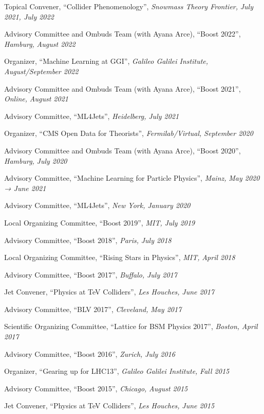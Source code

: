 \item Topical Convener, ``Collider Phenomenology'', \emph{Snowmass Theory Frontier, }\emph{July 2021, July 2022}
\item Advisory Committee and Ombuds Team (with Ayana Arce), ``Boost 2022'', \emph{Hamburg, }\emph{August 2022}
\item Organizer, ``Machine Learning at GGI'', \emph{Galileo Galilei Institute, }\emph{August/September 2022}
\item Advisory Committee and Ombuds Team (with Ayana Arce), ``Boost 2021'', \emph{Online, }\emph{August 2021}
\item Advisory Committee, ``ML4Jets'', \emph{Heidelberg, }\emph{July 2021}
\item Organizer, ``CMS Open Data for Theorists'', \emph{Fermilab/Virtual, }\emph{September 2020}
\item Advisory Committee and Ombuds Team (with Ayana Arce), ``Boost 2020'', \emph{Hamburg, }\emph{July 2020}
\item Advisory Committee, ``Machine Learning for Particle Physics'', \emph{Mainz, }\emph{May 2020 → June 2021}
\item Advisory Committee, ``ML4Jets'', \emph{New York, }\emph{January 2020}
\item Local Organizing Committee, ``Boost 2019'', \emph{MIT, }\emph{July 2019}
\item Advisory Committee, ``Boost 2018'', \emph{Paris, }\emph{July 2018}
\item Local Organizing Committee, ``Rising Stars in Physics'', \emph{MIT, }\emph{April 2018}
\item Advisory Committee, ``Boost 2017'', \emph{Buffalo, }\emph{July 2017}
\item Jet Convener, ``Physics at TeV Colliders'', \emph{Les Houches, }\emph{June 2017}
\item Advisory Committee, ``BLV 2017'', \emph{Cleveland, }\emph{May 2017}
\item Scientific Organizing Committee, ``Lattice for BSM Physics 2017'', \emph{Boston, }\emph{April 2017}
\item Advisory Committee, ``Boost 2016'', \emph{Zurich, }\emph{July 2016}
\item Organizer, ``Gearing up for LHC13'', \emph{Galileo Galilei Institute, }\emph{Fall 2015}
\item Advisory Committee, ``Boost 2015'', \emph{Chicago, }\emph{August 2015}
\item Jet Convener, ``Physics at TeV Colliders'', \emph{Les Houches, }\emph{June 2015}
